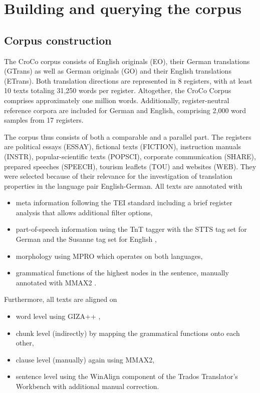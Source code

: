 \documentclass[output=paper]{LSP/langsci}
\begin{document}
\section{Building and querying the corpus}\label{sec:culo:3}
\subsection{Corpus construction}\label{sec:culo:3.1}
The CroCo corpus consists of English originals (EO), their German translations (GTrans) as well as German originals (GO) and their English translations (ETrans). Both translation directions are represented in 8 registers, with at least 10 texts totaling 31,250 words per register. Altogether, the CroCo Corpus comprises approximately one million words. Additionally, register-neutral reference corpora are included for German and English, comprising 2,000 word samples from 17 registers.

The corpus thus consists of both a comparable and a parallel part. The registers are political essays (ESSAY), fictional texts (FICTION), instruction manuals (INSTR), popular-scientific texts (POPSCI), corporate communication (SHARE), prepared speeches (SPEECH), tourism leaflets (TOU) and websites (WEB). They were selected because of their relevance for the investigation of translation properties in the language pair English-German. All texts are annotated with

\begin{itemize}
\item 
meta information following the TEI standard \citep{Sperberg-McQueen1994, Burnard2007} including a brief register analysis that allows additional filter options, 
\item 
part-of-speech information using the TnT tagger \citep{Brants2000} with the STTS tag set for German \citep{SchillerEtAl1999} and the Susanne tag set for English \citep{Sampson1995},
\item 
morphology using MPRO \citep{Maas2009} which operates on both languages,
\item
grammatical functions of the highest nodes in the sentence, manually annotated with MMAX2 \citep{Müller2006}.
\end{itemize}

Furthermore, all texts are aligned on 

\begin{itemize}
\item  
word level using GIZA++ \citep{Och2003},
\item
chunk level (indirectly) by mapping the grammatical functions onto each other,
\item 
clause level (manually) again using MMAX2,
\item 
sentence level using the WinAlign component of the Trados Translator's Workbench \citep{Heyn1996} with additional manual correction.
\end{itemize}
\end{document}
